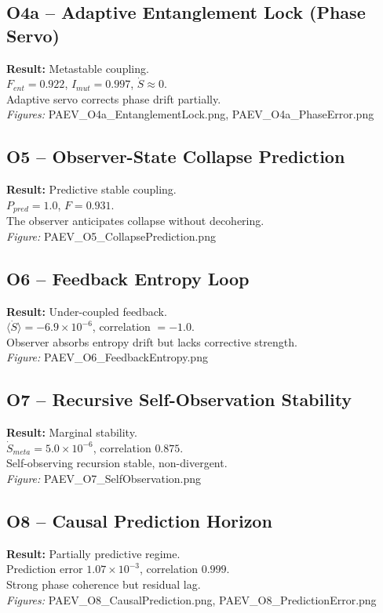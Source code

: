 \documentclass[12pt]{article}
\begin{document}
\subsection*{O4a – Adaptive Entanglement Lock (Phase Servo)}
\textbf{Result:} Metastable coupling. \\
$F_{ent}=0.922$, $I_{mut}=0.997$, $\dot{S}\approx0$. \\
Adaptive servo corrects phase drift partially. \\
\textit{Figures:} PAEV\_O4a\_EntanglementLock.png, PAEV\_O4a\_PhaseError.png

\subsection*{O5 – Observer-State Collapse Prediction}
\textbf{Result:} Predictive stable coupling. \\
$P_{pred}=1.0$, $F=0.931$. \\
The observer anticipates collapse without decohering. \\
\textit{Figure:} PAEV\_O5\_CollapsePrediction.png

\subsection*{O6 – Feedback Entropy Loop}
\textbf{Result:} Under-coupled feedback. \\
$\langle \dot{S} \rangle=-6.9\times10^{-6}$, correlation $=-1.0$. \\
Observer absorbs entropy drift but lacks corrective strength. \\
\textit{Figure:} PAEV\_O6\_FeedbackEntropy.png

\subsection*{O7 – Recursive Self-Observation Stability}
\textbf{Result:} Marginal stability. \\
$\dot{S}_{meta}=5.0\times10^{-6}$, correlation $0.875$. \\
Self-observing recursion stable, non-divergent. \\
\textit{Figure:} PAEV\_O7\_SelfObservation.png

\subsection*{O8 – Causal Prediction Horizon}
\textbf{Result:} Partially predictive regime. \\
Prediction error $1.07\times10^{-3}$, correlation $0.999$. \\
Strong phase coherence but residual lag. \\
\textit{Figures:} PAEV\_O8\_CausalPrediction.png, PAEV\_O8\_PredictionError.png
\end{document}
